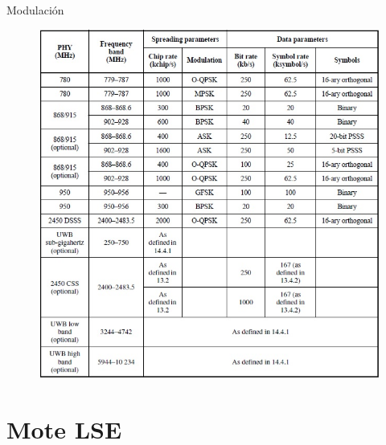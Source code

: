 \documentclass[aspectratio=169, handout]{beamer}
\begin{document}
\begin{frame}{Modulación}
\begin{minipage}[c]{1.0\linewidth}
\begin{figure}[H]
	\includegraphics[height=1\textheight]{./imagenes/modulaciones.jpg}
		\end{figure}	
\end{minipage}
\end{frame}

\section{Mote LSE}

\end{document}
